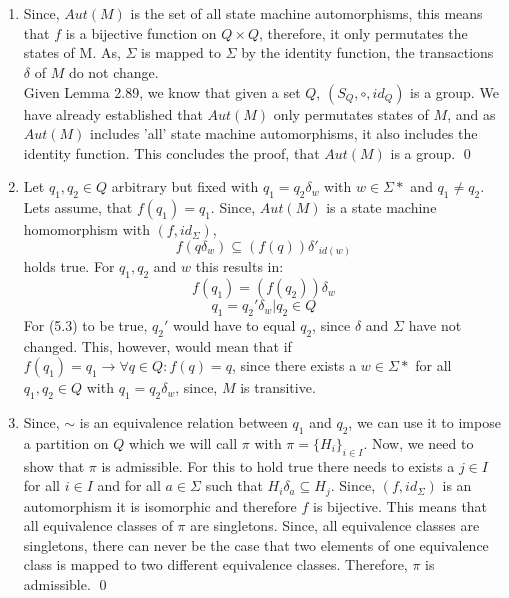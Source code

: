 \documentclass[a4paper,12pt,numbers=noenddot]{scrreport}
\begin{document}
\section{}
\begin{enumerate}
    \item Since, $Aut(M)$ is the set of all state machine automorphisms, this means that $f$ is a bijective function on $Q \times Q$, therefore, it only permutates the states of M. As, $\Sigma$ is  mapped to $\Sigma$ by the identity function, the transactions $\delta$ of $M$ do not change.\\
    Given Lemma 2.89, we know that given a set $Q$, $(S_Q, \circ, id_Q)$ is a group. We have already established that $Aut(M)$ only permutates states of $M$, and as $Aut(M)$ includes 'all' state machine automorphisms, it also includes the identity function.
    This concludes the proof, that $Aut(M)$ is a group.
    \qed
    \item Let $q_1, q_2 \in Q$ arbitrary but fixed with $q_1 = q_2\delta_w$ with $w \in \Sigma*$ and $q_1 \neq q_2$. Lets assume, that $f(q_1) = q_1$. Since, $Aut(M)$ is a state machine homomorphism with $(f, id_\Sigma)$, 
    \begin{equation}
        f(q\delta_w) \subseteq (f(q))\delta'_{id(w)}
    \end{equation}
    holds true. For $q_1, q_2$ and $w$ this results in:
    \begin{equation}
        f(q_1) = (f(q_2))\delta_w
    \end{equation}
    \begin{equation}
        q_1 = q_2'\delta_w | q_2 \in Q
    \end{equation}
    For (5.3) to be true, $q_2'$ would have to equal $q_2$, since $\delta$ and $\Sigma$ have not changed. This, however, would mean that if $f(q_1) = q_1 \rightarrow \forall q \in Q: f(q) = q$, since there exists a $w \in \Sigma*$ for all $q_1, q_2 \in Q$ with $q_1 = q_2\delta_w$, since, $M$ is transitive.
    \item Since, $\sim$ is an equivalence relation between $q_1$ and $q_2$, we can use it to impose a partition on $Q$ which we will call $\pi$ with $\pi = \{H_i\}_{i\in I}$. Now, we need to show that $\pi$ is admissible. For this to hold true there needs to exists a $j \in I$ for all $i \in I$ and for all $a \in \Sigma$ such that $H_i\delta_a \subseteq H_j$. Since, $(f, id_\Sigma)$ is an automorphism it is isomorphic and therefore $f$ is bijective. This means that all equivalence classes of $\pi$ are singletons. Since, all equivalence classes are singletons, there can never be the case that two elements of one equivalence class is mapped to two different equivalence classes. Therefore, $\pi$ is admissible.
    \qed
\end{enumerate}

\section{}
\end{document}
